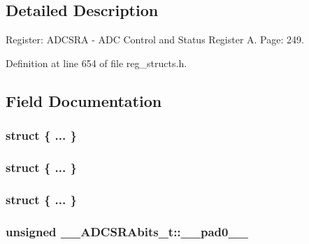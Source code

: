 \subsection{Detailed Description}
Register\+: A\+D\+C\+S\+R\+A -\/ A\+D\+C Control and Status Register A. Page\+: 249. 

Definition at line 654 of file reg\+\_\+structs.\+h.



\subsection{Field Documentation}
\hypertarget{union_____a_d_c_s_r_abits__t_a2bbcf176bdd58bdf8d2d6133cad8a26b}{\subsubsection[{"@157}]{\setlength{\rightskip}{0pt plus 5cm}struct \{ ... \} }}\label{union_____a_d_c_s_r_abits__t_a2bbcf176bdd58bdf8d2d6133cad8a26b}
\hypertarget{union_____a_d_c_s_r_abits__t_a464920ed247830fb9228c845a50ad56b}{\subsubsection[{"@159}]{\setlength{\rightskip}{0pt plus 5cm}struct \{ ... \} }}\label{union_____a_d_c_s_r_abits__t_a464920ed247830fb9228c845a50ad56b}
\hypertarget{union_____a_d_c_s_r_abits__t_a3045d2cab1940f7ec9c50f41c4eadf65}{\subsubsection[{"@161}]{\setlength{\rightskip}{0pt plus 5cm}struct \{ ... \} }}\label{union_____a_d_c_s_r_abits__t_a3045d2cab1940f7ec9c50f41c4eadf65}
\hypertarget{union_____a_d_c_s_r_abits__t_ac73c6f5b63ad17d412a00015f0393957}{
\subsubsection[{\+\_\+\+\_\+pad0\+\_\+\+\_\+}]{\setlength{\rightskip}{0pt plus 5cm}unsigned \+\_\+\+\_\+\+A\+D\+C\+S\+R\+Abits\+\_\+t\+::\+\_\+\+\_\+pad0\+\_\+\+\_\+}}\label{union_____a_d_c_s_r_abits__t_ac73c6f5b63ad17d412a00015f0393957}


